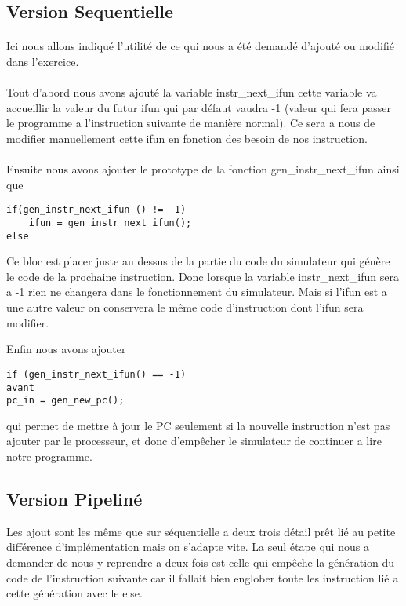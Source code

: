 \documentclass[12pt]{article}
\begin{document}
\subsection{Version Sequentielle}
\paragraph{}Ici nous allons indiqué l'utilité de ce qui nous a été demandé d'ajouté ou modifié dans l'exercice.

\paragraph{}Tout d'abord nous avons  ajouté la variable instr\_next\_ifun cette variable va accueillir la valeur du futur ifun qui par défaut vaudra -1 (valeur qui fera passer le programme a l'instruction suivante de manière normal). Ce sera a nous de modifier manuellement cette ifun en fonction des besoin de nos instruction.

\paragraph{}Ensuite nous avons ajouter le prototype de la fonction gen\_instr\_next\_ifun ainsi que 
\begin{verbatim}
if(gen_instr_next_ifun () != -1)
	ifun = gen_instr_next_ifun();
else
\end{verbatim}
Ce bloc est placer juste au dessus de la partie du code du simulateur qui génère le code de la prochaine instruction. Donc lorsque la variable instr\_next\_ifun sera a -1 rien ne changera dans le fonctionnement du simulateur. Mais si l'ifun est a une autre valeur on conservera le même code d'instruction dont l'ifun sera modifier.

Enfin nous avons ajouter 
\begin{verbatim}
if (gen_instr_next_ifun() == -1)
avant
pc_in = gen_new_pc();
\end{verbatim}
qui permet de mettre à jour le PC seulement si la nouvelle instruction n'est pas ajouter par le processeur, et donc d’empêcher le simulateur de continuer a lire notre programme.

\subsection{Version Pipeliné}
Les ajout sont les même que sur séquentielle a deux trois détail prêt lié au petite différence d’implémentation mais on s’adapte vite. La seul étape qui nous a demander de nous y reprendre a deux fois est celle qui empêche la génération du code de l'instruction suivante car il fallait bien englober toute les instruction lié a cette génération avec le else.
\end{document}
